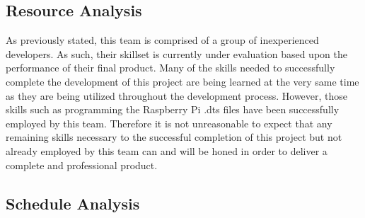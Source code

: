 \subsection{Resource Analysis}
As previously stated, this team is comprised of a group of inexperienced developers. As such, their skillset is currently under evaluation based upon the performance of their final product. Many of the skills needed to successfully complete the development of this project are being learned at the very same time as they are being utilized throughout the development process. However, those skills such as programming the Raspberry Pi .dts files have been successfully employed by this team. Therefore it is not unreasonable to expect that any remaining skills necessary to the successful completion of this project but not already employed by this team can and will be honed in order to deliver a complete and professional product.
\subsection{Schedule Analysis}
